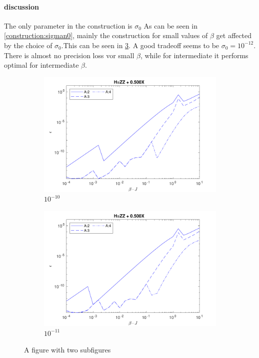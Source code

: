 \paragraph{discussion}

The only parameter in the construction is $\sigma_0$ As can be seen in \cref{construction:sigman0}, mainly the construction for small values of $\beta$ get affected by the choice of $\sigma_0$.This can be seen in \cref{fig:sigman0}. A good tradeoff seems to be $ \sigma_0 = {10}^{-12}$. There is almost no precision loss vor small $\beta$, while for intermediate it performs optimal for intermediate $\beta$.


\begin{figure}
    \centering
    \begin{subfigure}{\textwidth}
        \centering
        \includegraphics[width=0.8\linewidth]{Figuren/mpo_construction/sigm0/e10.pdf}
        \caption{ ${10}^{-10}$}
        \label{fig:sub1}
    \end{subfigure}%

    \begin{subfigure}{\textwidth}
        \centering
        \includegraphics[width=0.8\linewidth]{Figuren/mpo_construction/sigm0/e11.pdf}
        \caption{${10}^{-11}$}
        \label{fig:sub2}
    \end{subfigure}
    \caption{A figure with two subfigures}
    \label{fig:sigman0}
\end{figure}


